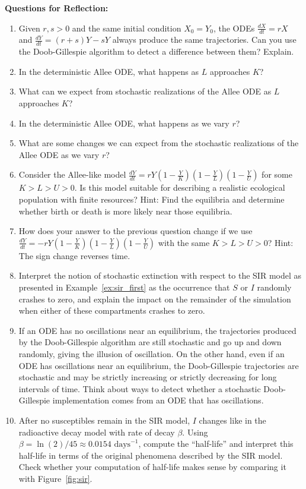 \noindent \textup{{\bf Questions for Reflection:}}
\begin{enumerate}

\item Given $r, s > 0$ and the same initial condition $X_0 = Y_0$, the ODEs $\frac{dX}{dt} = rX$ and $\frac{dY}{dt} = (r+s)Y - sY$ always produce the same trajectories. Can you use the Doob-Gillespie algorithm to detect a difference between them? Explain.

\item In the deterministic Allee ODE, what happens as $L$ approaches $K$?

\item What can we expect from stochastic realizations of the Allee ODE as $L$ approaches $K$?

\item In the deterministic Allee ODE, what happens as we vary $r$?

\item What are some changes we can expect from the stochastic realizations of the Allee ODE as we vary $r$?

\item Consider the Allee-like model $\frac{dY}{dt} = rY(1-\frac{Y}{K})(1-\frac{Y}{L})(1-\frac{Y}{U})$ for some $K > L > U > 0$. Is this model suitable for describing a realistic ecological population with finite resources? Hint: Find the equilibria and determine whether birth or death is more likely near those equilibria.

\item How does your answer to the previous question change if we use $\frac{dY}{dt} = -rY(1-\frac{Y}{K})(1-\frac{Y}{L})(1-\frac{Y}{U})$ with the same $K > L > U > 0$? Hint: The sign change reverses time.

\item Interpret the notion of stochastic extinction with respect to the SIR model as presented in Example~\ref{ex:sir_first} as the occurrence that $S$ or $I$ randomly crashes to zero, and explain the impact on the remainder of the simulation when either of these compartments crashes to zero.

\item If an ODE has no oscillations near an equilibrium, the trajectories produced by the Doob-Gillespie algorithm are still stochastic and go up and down randomly, giving the illusion of oscillation. On the other hand, even if an ODE has oscillations near an equilibrium, the Doob-Gillespie trajectories are stochastic and may be strictly increasing or strictly decreasing for long intervals of time. Think about ways to detect whether a stochastic Doob-Gillespie implementation comes from an ODE that has oscillations.

\item After no susceptibles remain in the SIR model, $I$ changes like in the radioactive decay model with rate of decay $\beta$. Using $\beta = \ln(2)/45 \approx 0.0154\text{ days}^{-1}$, compute the ``half-life'' and interpret this half-life in terms of the original phenomena described by the SIR model. Check whether your computation of half-life makes sense by comparing it with Figure~\ref{fig:sir}.


\end{enumerate}
